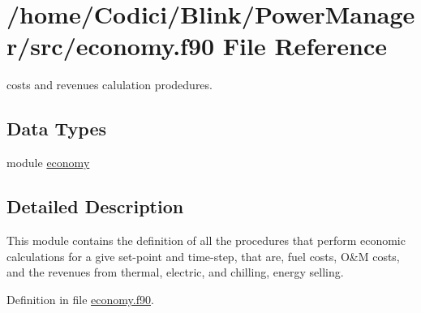\hypertarget{economy_8f90}{\section{/home/\-Codici/\-Blink/\-Power\-Manager/src/economy.f90 File Reference}
\label{economy_8f90}
}


costs and revenues calulation prodedures.  


\subsection*{Data Types}
\begin{DoxyCompactItemize}
\item 
module \hyperlink{classeconomy}{economy}
\end{DoxyCompactItemize}


\subsection{Detailed Description}
This module contains the definition of all the procedures that perform economic calculations for a give set-\/point and time-\/step, that are, fuel costs, O\&M costs, and the revenues from thermal, electric, and chilling, energy selling. 

Definition in file \hyperlink{economy_8f90_source}{economy.\-f90}.

